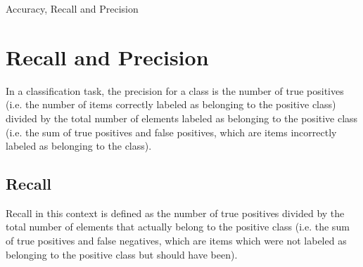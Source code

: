 \documentclass[12pt]{article}
\begin{document}
\begin{center}
\LARGE{Accuracy, Recall and Precision}
\end{center}

\section{Recall and Precision}
In a classification task, the precision for a class is the number of true positives (i.e. the number of items correctly labeled as belonging to the positive class) divided by the total number of elements labeled as belonging to the positive class (i.e. the sum of true positives and false positives, which are items incorrectly labeled as belonging to the class). 


\subsection*{Recall}
Recall in this context is defined as the number of true positives divided by the total number of elements that actually belong to the positive class (i.e. the sum of true positives and false negatives, which are items which were not labeled as belonging to the positive class but should have been).
\end{document}
